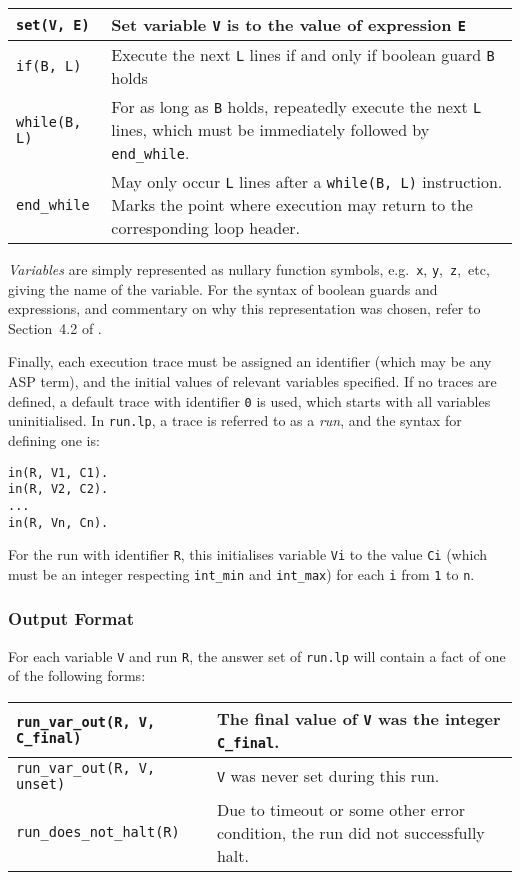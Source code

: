 \documentclass[a4paper,twoside,notitlepage,12pt]{article}
\begin{document}
\begin{tabularx}{\textwidth}{|l|X|}
\hline
\verb|set(V, E)| &
Set variable \verb|V| is to the value of expression \verb|E| \\*
\hline
\verb|if(B, L)| &
Execute the next \verb|L| lines if and only if boolean guard \verb|B| holds \\*
\hline
\verb|while(B, L)| &
For as long as \verb|B| holds, repeatedly execute the next \verb|L| lines, which must 
be immediately followed by \verb|end_while|. \\*
\hline
\verb|end_while| &
May only occur \verb|L| lines after a \verb|while(B, L)| instruction. Marks the point 
where execution may return to the corresponding loop header. \\*
\hline
\end{tabularx}

\emph{Variables} are simply represented as nullary function symbols, e.g.\ \verb|x|, 
\verb|y|,\ \verb|z|,\ etc, giving the name of the variable. For the syntax of boolean 
guards and expressions, and commentary on why this representation was chosen, refer to 
Section~4.2 of \cite{final}.

Finally, each execution trace must be assigned an identifier (which may be any ASP 
term), and the initial values of relevant variables specified. If no traces are defined, 
a default trace with identifier \verb|0| is used, which starts with all variables 
uninitialised. In \verb|run.lp|, a trace is referred to as a \emph{run}, and the syntax 
for defining one is:

\begin{verbatim}
in(R, V1, C1).
in(R, V2, C2).
...
in(R, Vn, Cn).
\end{verbatim}

For the run with identifier \verb|R|, this initialises variable \verb|Vi| to the value 
\verb|Ci| (which must be an integer respecting \verb|int_min| and \verb|int_max|) for 
each \verb|i| from \verb|1| to \verb|n|.

\subsubsection{Output Format}

For each variable \verb|V| and run \verb|R|, the answer set of \verb|run.lp| will 
contain a fact of one of the following forms:

\begin{tabularx}{\textwidth}{|l|X|}
\hline
\verb|run_var_out(R, V, C_final)| &
The final value of \verb|V| was the integer \verb|C_final|. \\*
\hline
\verb|run_var_out(R, V, unset)| &
\verb|V| was never set during this run. \\*
\hline
\verb|run_does_not_halt(R)| &
Due to timeout or some other error condition, the run did not successfully halt. \\*
\hline
\end{tabularx}
\end{document}
